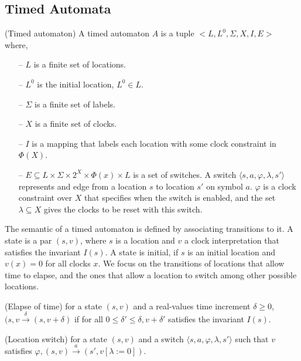 \subsection{Timed Automata}
%
\theoremstyle{definition}
\begin{definition}{(Timed automaton)} \cite{timedAutomata}
	A timed automaton $A$ is a tuple $< L , L^{0}, \Sigma ,X, I, E >$ where,
\end{definition}
%
\begin{itemize}
	\item[--]
	$L$ is a finite set of locations.
	\item[--]
	$L^{0}$ is the initial location, $L^{0}\in L$.
	\item[--]
	$\Sigma$ is a finite set of labels. 
	\item[--]
	$X$ is a finite set of clocks. 
	\item[--]
	$I$ is a mapping that labels each location with some clock constraint in $\Phi (X)$. 
	\item[--]
	$E \subseteq L \times \Sigma \times 2^{X} \times \Phi (x) \times L$ is a set of switches. A switch $\langle s,a,\varphi, \lambda, s' \rangle$  represents and edge from a location $s$ to location $s'$ on symbol $a$. $\varphi$ is a clock constraint over $X$ that specifies when the switch is enabled, and the set $\lambda \subseteq X$ gives the clocks to be reset with this switch. 
\end{itemize}
%
The semantic of a timed automaton is defined by associating transitions to it. A state is a par $(s,v)$, where $s$ is a location and $v$ a clock interpretation that satisfies the invariant $I(s)$. A state is initial, if $s$ is an initial location and $v(x)=0$ for all clocks $x$. We focus on the transitions of locations that allow time to elapse, and the ones that allow a location to switch among other possible locations. 
%
\theoremstyle{definition}
\begin{definition}{(Elapse of time)} 
	for a state $(s,v)$ and a real-values time increment $\delta \geq 0$, 
	$(s,v \xrightarrow{\delta} (s,v+ \delta)$ if for all $0 \leq \delta' \leq \delta, v+\delta'$ satisfies the invariant $I(s)$. 
\end{definition}
%
\theoremstyle{definition}
\begin{definition}{(Location switch)}
	for a state $(s,v)$ and a switch  $\langle s,a,\varphi, \lambda, s' \rangle$ such that $v$ satisfies $\varphi, (s,v) \xrightarrow{a} (s', v[\lambda:=0])$. 
\end{definition}

